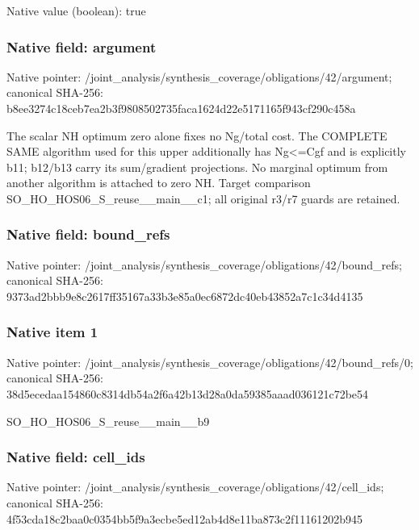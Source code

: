 \documentclass[10pt,a4paper]{article}
\begin{document}
Native value (boolean): true

\subsubsection{Native field: argument}
Native pointer: /joint\_\allowbreak{}analysis/synthesis\_\allowbreak{}coverage/obligations/42/argument; canonical SHA-256: b8ee3274c18ceb7ea2b3f9808502735faca1624d22e5171165f943cf290c458a

\begingroup\raggedright\sloppy The scalar NH optimum zero alone fixes no Ng/\allowbreak{}total cost. The COMPLETE SAME algorithm used for this upper additionally has Ng<=\allowbreak{}Cgf and is explicitly b11;\allowbreak{} b12/\allowbreak{}b13 carry its sum/\allowbreak{}gradient projections. No marginal optimum from another algorithm is attached to zero NH. Target comparison SO\_\allowbreak{}HO\_\allowbreak{}HOS06\_\allowbreak{}S\_\allowbreak{}reuse\_\allowbreak{}\_\allowbreak{}main\_\allowbreak{}\_\allowbreak{}c1;\allowbreak{} all original r3/\allowbreak{}r7 guards are retained.\par\endgroup

\subsubsection{Native field: bound\_\allowbreak{}refs}
Native pointer: /joint\_\allowbreak{}analysis/synthesis\_\allowbreak{}coverage/obligations/42/bound\_\allowbreak{}refs; canonical SHA-256: 9373ad2bbb9e8c2617ff35167a33b3e85a0ec6872dc40eb43852a7c1c34d4135

\subsubsection{Native item 1}
Native pointer: /joint\_\allowbreak{}analysis/synthesis\_\allowbreak{}coverage/obligations/42/bound\_\allowbreak{}refs/0; canonical SHA-256: 38d5ecedaa154860c8314db54a2f6a42b13d28a0da59385aaad036121c72be54

\begingroup\raggedright\sloppy SO\_\allowbreak{}HO\_\allowbreak{}HOS06\_\allowbreak{}S\_\allowbreak{}reuse\_\allowbreak{}\_\allowbreak{}main\_\allowbreak{}\_\allowbreak{}b9\par\endgroup

\subsubsection{Native field: cell\_\allowbreak{}ids}
Native pointer: /joint\_\allowbreak{}analysis/synthesis\_\allowbreak{}coverage/obligations/42/cell\_\allowbreak{}ids; canonical SHA-256: 4f53cda18c2baa0c0354bb5f9a3ecbe5ed12ab4d8e11ba873c2f11161202b945
\end{document}
